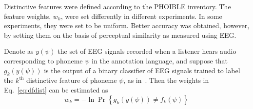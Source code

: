 Distinctive features were defined according to the PHOIBLE inventory.
The feature weights, $w_k$, were set differently in different
experiments.  In some experiments, they were set to be uniform.
Better accuracy was obtained, however, by setting them on the basis of
perceptual similarity as measured using EEG.

Denote as $y(\psi)$ the set of EEG signals recorded when a listener
hears audio corresponding to phoneme $\psi$ in the annotation
language, and suppose that $g_k(y(\psi))$ is the output of a binary
classifier of EEG signals trained to label the $k^{\textrm{th}}$
distinctive feature of phoneme $\psi$, as in~\cite{Liberto15}.  Then
the weights in Eq.~\ref{eq:dfdist} can be estimated as
\begin{equation}
  w_k = -\ln\Pr\left\{g_k(y(\psi))\ne f_k(\psi)\right\}
  \label{eq:eegdist}
\end{equation}

